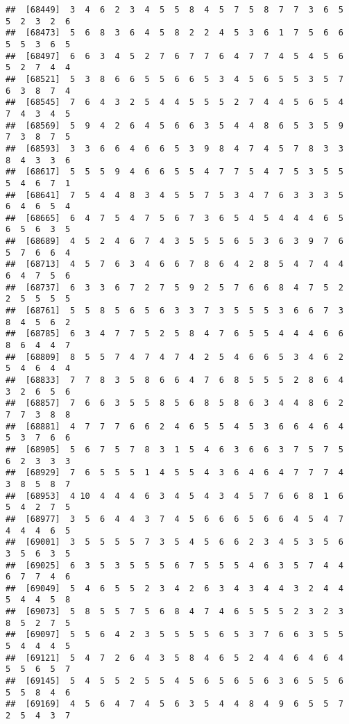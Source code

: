 \documentclass[
]{book}
\begin{document}
\begin{verbatim}
##  [68449]  3  4  6  2  3  4  5  5  8  4  5  7  5  8  7  7  3  6  5  5  2  3  2  6
##  [68473]  5  6  8  3  6  4  5  8  2  2  4  5  3  6  1  7  5  6  6  5  5  3  6  5
##  [68497]  6  6  3  4  5  2  7  6  7  7  6  4  7  7  4  5  4  5  6  5  2  7  4  4
##  [68521]  5  3  8  6  6  5  5  6  6  5  3  4  5  6  5  5  3  5  7  6  3  8  7  4
##  [68545]  7  6  4  3  2  5  4  4  5  5  5  2  7  4  4  5  6  5  4  7  4  3  4  5
##  [68569]  5  9  4  2  6  4  5  6  6  3  5  4  4  8  6  5  3  5  9  7  3  8  7  5
##  [68593]  3  3  6  6  4  6  6  5  3  9  8  4  7  4  5  7  8  3  3  8  4  3  3  6
##  [68617]  5  5  5  9  4  6  6  5  5  4  7  7  5  4  7  5  3  5  5  5  4  6  7  1
##  [68641]  7  5  4  4  8  3  4  5  5  7  5  3  4  7  6  3  3  3  5  6  4  6  5  4
##  [68665]  6  4  7  5  4  7  5  6  7  3  6  5  4  5  4  4  4  6  5  6  5  6  3  5
##  [68689]  4  5  2  4  6  7  4  3  5  5  5  6  5  3  6  3  9  7  6  5  7  6  6  4
##  [68713]  4  5  7  6  3  4  6  6  7  8  6  4  2  8  5  4  7  4  4  6  4  7  5  6
##  [68737]  6  3  3  6  7  2  7  5  9  2  5  7  6  6  8  4  7  5  2  2  5  5  5  5
##  [68761]  5  5  8  5  6  5  6  3  3  7  3  5  5  5  3  6  6  7  3  8  4  5  6  2
##  [68785]  6  3  4  7  7  5  2  5  8  4  7  6  5  5  4  4  4  6  6  8  6  4  4  7
##  [68809]  8  5  5  7  4  7  4  7  4  2  5  4  6  6  5  3  4  6  2  5  4  6  4  4
##  [68833]  7  7  8  3  5  8  6  6  4  7  6  8  5  5  5  2  8  6  4  3  2  6  5  6
##  [68857]  7  6  6  3  5  5  8  5  6  8  5  8  6  3  4  4  8  6  2  7  7  3  8  8
##  [68881]  4  7  7  7  6  6  2  4  6  5  5  4  5  3  6  6  4  6  4  5  3  7  6  6
##  [68905]  5  6  7  5  7  8  3  1  5  4  6  3  6  6  3  7  5  7  5  6  2  3  3  3
##  [68929]  7  6  5  5  5  1  4  5  5  4  3  6  4  6  4  7  7  7  4  3  8  5  8  7
##  [68953]  4 10  4  4  4  6  3  4  5  4  3  4  5  7  6  6  8  1  6  5  4  2  7  5
##  [68977]  3  5  6  4  4  3  7  4  5  6  6  6  5  6  6  4  5  4  7  4  4  4  6  5
##  [69001]  3  5  5  5  5  7  3  5  4  5  6  6  2  3  4  5  3  5  6  3  5  6  3  5
##  [69025]  6  3  5  3  5  5  5  6  7  5  5  5  4  6  3  5  7  4  4  6  7  7  4  6
##  [69049]  5  4  6  5  5  2  3  4  2  6  3  4  3  4  4  3  2  4  4  5  4  4  5  8
##  [69073]  5  8  5  5  7  5  6  8  4  7  4  6  5  5  5  2  3  2  3  8  5  2  7  5
##  [69097]  5  5  6  4  2  3  5  5  5  5  6  5  3  7  6  6  3  5  5  5  4  4  4  5
##  [69121]  5  4  7  2  6  4  3  5  8  4  6  5  2  4  4  6  4  6  4  5  5  6  5  7
##  [69145]  5  4  5  5  2  5  5  4  5  6  5  6  5  6  3  6  5  5  6  5  5  8  4  6
##  [69169]  4  5  6  4  7  4  5  6  3  5  4  4  8  4  9  6  5  5  7  2  5  4  3  7

\end{verbatim}
\end{document}
